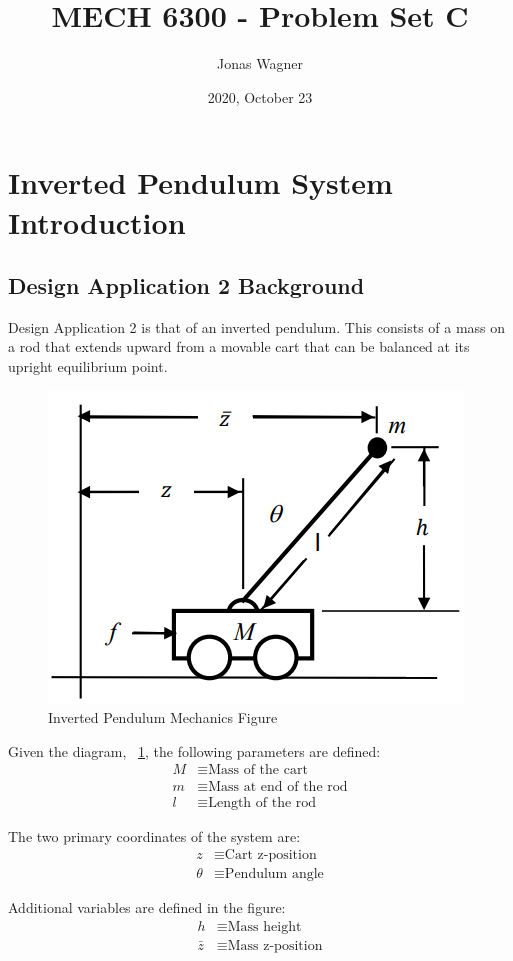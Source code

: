 \documentclass[]{article}
\title{MECH 6300 - Problem Set C}
\author{Jonas Wagner}
\date{2020, October 23}
\begin{document}
\maketitle


\section{Inverted Pendulum System Introduction}

	\subsection{Design Application 2 Background}
	
		Design Application 2 is that of an inverted pendulum. This consists of a mass on a rod that extends upward from a movable cart that can be balanced at its upright equilibrium point.
		
		\begin{figure}[h]
			\centering
			\includegraphics[width=0.5\linewidth]{Fig/DesignApplication2}
			\caption[]{Inverted Pendulum Mechanics Figure}
			\label{fig:designapplication2}
		\end{figure}
		
		Given the diagram, \figurename \ \ref{fig:designapplication2}, the following parameters are defined:
		\begin{align*}
			M &\equiv \text{Mass of the cart}\\
			m &\equiv \text{Mass at end of the rod}\\
			l &\equiv \text{Length of the rod}
		\end{align*}
		
		The two primary coordinates of the system are:
		\begin{align*}
			z &\equiv \text{Cart z-position}\\
			\theta &\equiv \text{Pendulum angle}
		\end{align*}
		
		Additional variables are defined in the figure:
		\begin{align*}
			h &\equiv \text{Mass height}\\
			\bar{z} &\equiv \text{Mass z-position}
		\end{align*} 
		
\end{document}

